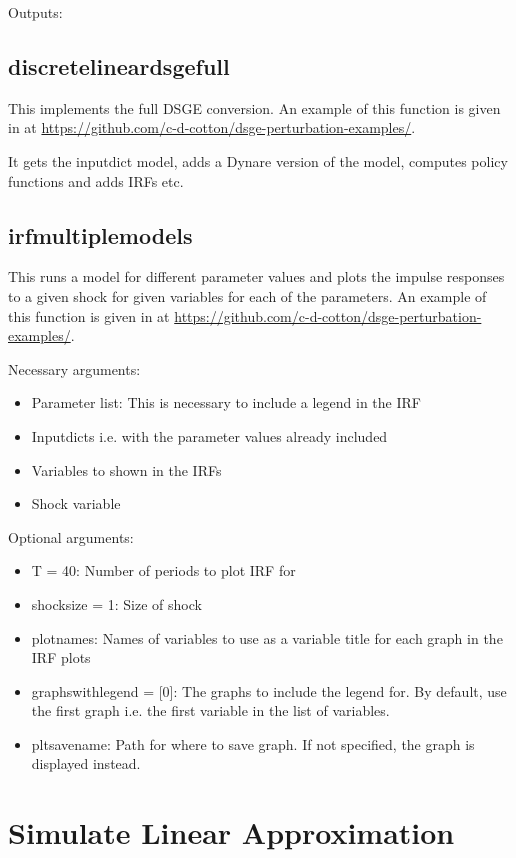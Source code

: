 \documentclass{article}
\theoremstyle{definition}
\begin{document}
Outputs:

\subsection{discretelineardsgefull}
This implements the full DSGE conversion. An example of this function is given in  at \url{https://github.com/c-d-cotton/dsge-perturbation-examples/}. 

It gets the inputdict model, adds a Dynare version of the model, computes policy functions and adds IRFs etc.

\subsection{irfmultiplemodels}
This runs a model for different parameter values and plots the impulse responses to a given shock for given variables for each of the parameters. An example of this function is given in  at \url{https://github.com/c-d-cotton/dsge-perturbation-examples/}. 

Necessary arguments:
\begin{itemize}
    \item Parameter list: This is necessary to include a legend in the IRF
    \item Inputdicts i.e. with the parameter values already included
    \item Variables to shown in the IRFs
    \item Shock variable
\end{itemize}

Optional arguments:
\begin{itemize}
    \item T = 40: Number of periods to plot IRF for
    \item shocksize = 1: Size of shock
    \item plotnames: Names of variables to use as a variable title for each graph in the IRF plots
    \item graphswithlegend = [0]: The graphs to include the legend for. By default, use the first graph i.e. the first variable in the list of variables.
    \item pltsavename: Path for where to save graph. If not specified, the graph is displayed instead.
\end{itemize}

\section{Simulate Linear Approximation}
\end{document}

